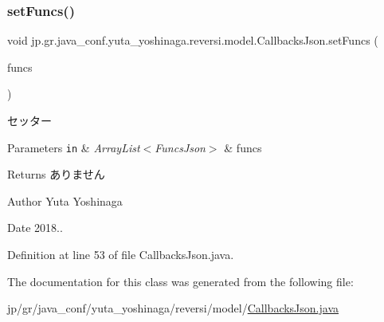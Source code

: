 \subsubsection{\texorpdfstring{set\+Funcs()}{setFuncs()}}
{\footnotesize\ttfamily void jp.\+gr.\+java\+\_\+conf.\+yuta\+\_\+yoshinaga.\+reversi.\+model.\+Callbacks\+Json.\+set\+Funcs (\begin{DoxyParamCaption}\item[{Array\+List$<$ \mbox{\hyperlink{classjp_1_1gr_1_1java__conf_1_1yuta__yoshinaga_1_1reversi_1_1model_1_1_funcs_json}{Funcs\+Json}} $>$}]{funcs }\end{DoxyParamCaption})}



セッター 


\begin{DoxyParams}[1]{Parameters}
\mbox{\tt in}  & {\em Array\+List$<$\+Funcs\+Json$>$} & funcs \\
\hline
\end{DoxyParams}
\begin{DoxyReturn}{Returns}
ありません 
\end{DoxyReturn}
\begin{DoxyAuthor}{Author}
Yuta Yoshinaga 
\end{DoxyAuthor}
\begin{DoxyDate}{Date}
2018.. 
\end{DoxyDate}


Definition at line 53 of file Callbacks\+Json.\+java.



The documentation for this class was generated from the following file\+:\begin{DoxyCompactItemize}
\item 
jp/gr/java\+\_\+conf/yuta\+\_\+yoshinaga/reversi/model/\mbox{\hyperlink{_callbacks_json_8java}{Callbacks\+Json.\+java}}\end{DoxyCompactItemize}
